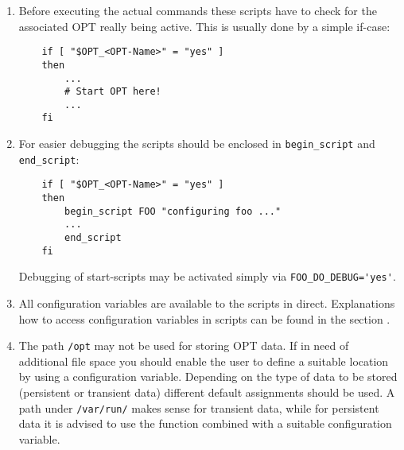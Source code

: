 \begin{enumerate}

  \item Before executing the actual commands these scripts have to check for the
    associated OPT really being active. This is usually done by a simple if-case:

\begin{example}
\begin{verbatim}
    if [ "$OPT_<OPT-Name>" = "yes" ]
    then
        ...
        # Start OPT here!
        ...
    fi
\end{verbatim}
\end{example}

  \item For easier debugging the scripts should be enclosed in
    \texttt{begin\_script} and \texttt{end\_script}:

\begin{example}
\begin{verbatim}
    if [ "$OPT_<OPT-Name>" = "yes" ]
    then
        begin_script FOO "configuring foo ..."
        ...
        end_script
    fi
\end{verbatim}
\end{example}

    Debugging of start-scripts may be activated simply via
    \verb+FOO_DO_DEBUG='yes'+.

  \item All configuration variables are available to the scripts in direct.
    Explanations how to access configuration variables in scripts can be found
    in the section .

  \item The path \texttt{/opt} may not be used for storing OPT data. If in need
    of additional file space you should enable the user to define a suitable
    location by using a configuration variable. Depending on the type of data
    to be stored (persistent or transient data) different default assignments
    should be used. A path under \texttt{/var/run/} makes sense for transient
    data, while for persistent data it is advised to use the function
     combined with a suitable
    configuration variable.

\end{enumerate}


